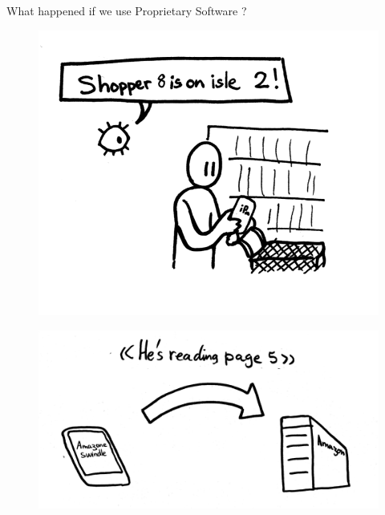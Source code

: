 \documentclass[notes,usenames,dvipsnames]{beamer}       %
\begin{document}
\begin{frame}
  \begin{center}
    \Large What happened if we use Proprietary Software ? \\
  \end{center}
\end{frame}

\begin{frame}
  \begin{figure}
    \centering
    \includegraphics[scale=0.8]{img/pr-track}
  \end{figure}
\end{frame}

\begin{frame}
  \begin{figure}
    \centering
    \includegraphics[scale=0.8]{img/pr-snoops}
  \end{figure}
\end{frame}
\end{document}
